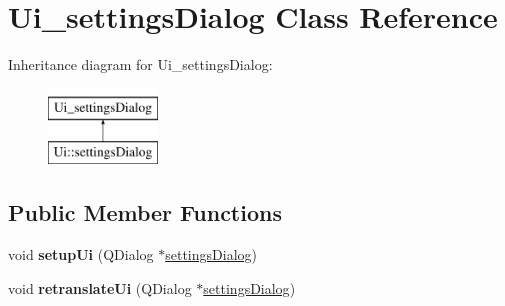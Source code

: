 \hypertarget{class_ui__settings_dialog}{}\section{Ui\+\_\+settings\+Dialog Class Reference}
\label{class_ui__settings_dialog}
Inheritance diagram for Ui\+\_\+settings\+Dialog\+:\begin{figure}[H]
\begin{center}
\leavevmode
\includegraphics[height=2.000000cm]{class_ui__settings_dialog}
\end{center}
\end{figure}
\subsection*{Public Member Functions}
\begin{DoxyCompactItemize}
\item 
\mbox{\label{class_ui__settings_dialog_af96d6b02d7d9762b18d968d8c8128f82}} 
void {\bfseries setup\+Ui} (Q\+Dialog $\ast$\mbox{\hyperlink{classsettings_dialog}{settings\+Dialog}})
\item 
\mbox{\label{class_ui__settings_dialog_a41fc817d3b4a6103aee2ded4a8f5c273}} 
void {\bfseries retranslate\+Ui} (Q\+Dialog $\ast$\mbox{\hyperlink{classsettings_dialog}{settings\+Dialog}})
\end{DoxyCompactItemize}
